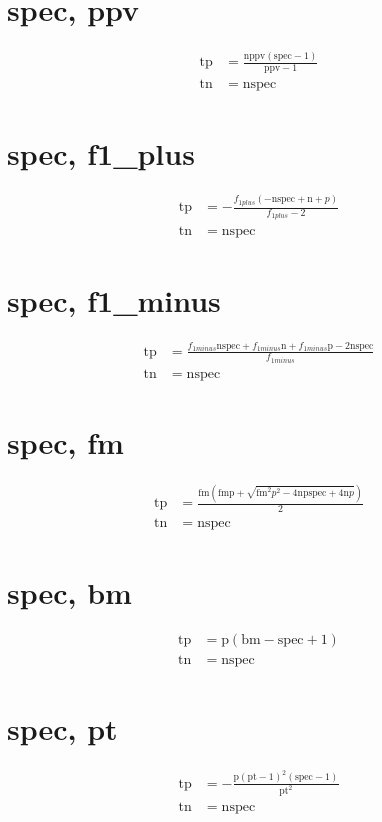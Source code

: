 \documentclass[3p,times]{elsarticle}
\begin{document}
\begin{footnotesize}
\begin{landscape}
\section{spec, ppv}
\begin{align}
\mathrm{tp} &= \frac{\mathrm{n} \mathrm{ppv} \left(\mathrm{spec} - 1\right)}{\mathrm{ppv} - 1}\\
\mathrm{tn} &= \mathrm{n} \mathrm{spec}
\end{align}
\section{spec, f1_plus}
\begin{align}
\mathrm{tp} &= - \frac{f_{1 plus} \left(- \mathrm{n} \mathrm{spec} + \mathrm{n} + p\right)}{f_{1 plus} - 2}\\
\mathrm{tn} &= \mathrm{n} \mathrm{spec}
\end{align}
\section{spec, f1_minus}
\begin{align}
\mathrm{tp} &= \frac{f_{1 minus} \mathrm{n} \mathrm{spec} + f_{1 minus} \mathrm{n} + f_{1 minus} \mathrm{p} - 2 \mathrm{n} \mathrm{spec}}{f_{1 minus}}\\
\mathrm{tn} &= \mathrm{n} \mathrm{spec}
\end{align}
\section{spec, fm}
\begin{align}
\mathrm{tp} &= \frac{\mathrm{fm} \left(\mathrm{fm} \mathrm{p} + \sqrt{\mathrm{fm}^{2} p^{2} - 4 \mathrm{n} \mathrm{p} \mathrm{spec} + 4 \mathrm{n} p}\right)}{2}\\
\mathrm{tn} &= \mathrm{n} \mathrm{spec}
\end{align}
\section{spec, bm}
\begin{align}
\mathrm{tp} &= \mathrm{p} \left(\mathrm{bm} - \mathrm{spec} + 1\right)\\
\mathrm{tn} &= \mathrm{n} \mathrm{spec}
\end{align}
\section{spec, pt}
\begin{align}
\mathrm{tp} &= - \frac{\mathrm{p} \left(\mathrm{pt} - 1\right)^{2} \left(\mathrm{spec} - 1\right)}{\mathrm{pt}^{2}}\\
\mathrm{tn} &= \mathrm{n} \mathrm{spec}
\end{align}

\end{landscape}
\end{footnotesize}
\end{document}
